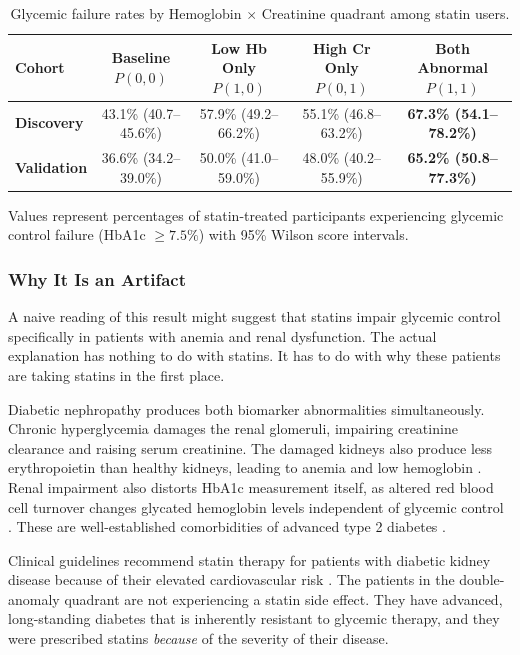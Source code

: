 \documentclass[10pt,letterpaper]{article}
\begin{document}
\begin{table}[htbp]
\centering
\small
\begin{threeparttable}
\caption{Glycemic failure rates by Hemoglobin $\times$ Creatinine quadrant among statin users.}
\begin{tabular*}{\linewidth}{@{\extracolsep{\fill}}lcccc@{}}
\toprule
\textbf{Cohort} & \textbf{Baseline} $P(0,0)$ & \textbf{Low Hb Only} $P(1,0)$ & \textbf{High Cr Only} $P(0,1)$ & \textbf{Both Abnormal} $P(1,1)$ \\
\midrule
\textbf{Discovery} & 43.1\% (40.7--45.6\%) & 57.9\% (49.2--66.2\%) & 55.1\% (46.8--63.2\%) & \textbf{67.3\% (54.1--78.2\%)} \\
\textbf{Validation} & 36.6\% (34.2--39.0\%) & 50.0\% (41.0--59.0\%) & 48.0\% (40.2--55.9\%) & \textbf{65.2\% (50.8--77.3\%)} \\
\bottomrule
\end{tabular*}
\begin{tablenotes}
\footnotesize
\item Values represent percentages of statin-treated participants experiencing glycemic control failure (HbA1c $\ge 7.5\%$) with 95\% Wilson score intervals.
\end{tablenotes}
\end{threeparttable}
\end{table}

\subsubsection{Why It Is an Artifact}
A naive reading of this result might suggest that statins impair glycemic control specifically in patients with anemia and renal dysfunction. The actual explanation has nothing to do with statins. It has to do with why these patients are taking statins in the first place.

Diabetic nephropathy produces both biomarker abnormalities simultaneously. Chronic hyperglycemia damages the renal glomeruli, impairing creatinine clearance and raising serum creatinine. The damaged kidneys also produce less erythropoietin than healthy kidneys, leading to anemia and low hemoglobin \cite{ritz2007, waggiallah2011, yun1999, thomas2004}. Renal impairment also distorts HbA1c measurement itself, as altered red blood cell turnover changes glycated hemoglobin levels independent of glycemic control \cite{peacock2008}. These are well-established comorbidities of advanced type 2 diabetes \cite{chang2011}.

Clinical guidelines recommend statin therapy for patients with diabetic kidney disease because of their elevated cardiovascular risk \cite{ada2024}. The patients in the double-anomaly quadrant are not experiencing a statin side effect. They have advanced, long-standing diabetes that is inherently resistant to glycemic therapy, and they were prescribed statins \textit{because} of the severity of their disease.
\end{document}
